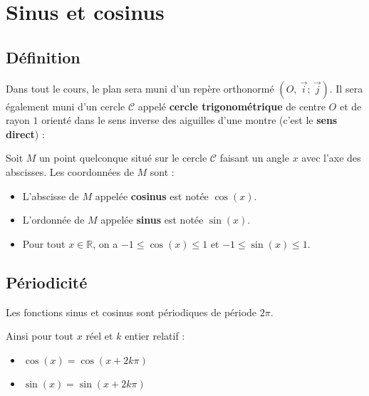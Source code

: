 



	\section{Sinus et cosinus}

	\subsection{Définition}

	Dans tout le cours, le plan sera muni d'un repère orthonormé $(O,\ \overrightarrow{i} ;\ \overrightarrow{j})$. Il sera également muni d'un cercle $\mathcal{C}$ appelé \textbf{cercle trigonométrique} de centre $O$ et de rayon $1$ orienté dans le sens inverse des aiguilles d'une montre (c'est le \textbf{sens direct}) :


	\begin{formula}
		Soit $M$ un point quelconque situé sur le cercle $\mathcal{C}$ faisant un angle $x$ avec l'axe des abscisses. Les coordonnées de $M$ sont :
		\begin{itemize}
			\item L'abscisse de $M$ appelée \textbf{cosinus} est notée $\cos(x)$.
			\item L'ordonnée de $M$ appelée \textbf{sinus} est notée $\sin(x)$.
			\item Pour tout $x \in \mathbb{R}$, on a $-1 \leq \cos(x) \leq 1$ et $-1 \leq \sin(x) \leq 1$.
		\end{itemize}
	\end{formula}

	\subsection{Périodicité}

	Les fonctions sinus et cosinus sont périodiques de période $2\pi$.

	\begin{formula}[Périodicité]
		Ainsi pour tout $x$ réel et $k$ entier relatif :
		\begin{itemize}
			\item $\cos(x) = \cos(x + 2k\pi)$
			\item $\sin(x) = \sin(x + 2k\pi)$
		\end{itemize}
	\end{formula}

